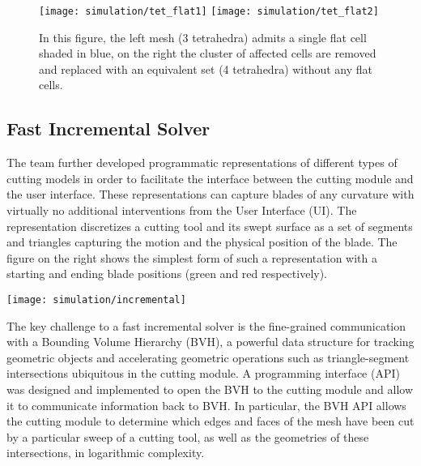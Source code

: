 \begin{figure}
  \centering%
  \texttt{[image: simulation/tet\_flat1]}\label{fig:tet_flat1}
  \hspace{10ex}
  \texttt{[image: simulation/tet\_flat2]}\label{fig:tet_flat2}
  \caption{In this figure, the left mesh (3 tetrahedra) admits a single flat cell shaded in blue, on the right the cluster of affected cells are removed and replaced with an equivalent set (4 tetrahedra) without any flat cells.}\label{fig:flat_tet}
\end{figure}


\subsection{Fast Incremental Solver}
\begin{minipage}{0.6\linewidth}
  The team further developed programmatic representations of different types of cutting models in order to facilitate the interface between the cutting module and the user interface. These representations can capture blades of any curvature with virtually no additional interventions from the User Interface (UI). The representation discretizes a cutting tool and its swept surface as a set of segments and triangles capturing the motion and the physical position of the blade. The figure on the right shows the simplest form of such a representation with a starting and ending blade positions (green and red respectively).
\end{minipage}
\hfill%
\begin{minipage}{0.4\linewidth}
  \texttt{[image: simulation/incremental]}\label{fig:incremental}
\end{minipage}

The key challenge to a fast incremental solver is the fine-grained communication with a Bounding Volume Hierarchy (BVH), a powerful data structure for tracking geometric objects and accelerating geometric operations such as triangle-segment intersections ubiquitous in the cutting module. A programming interface (API) was designed and implemented to open the BVH to the cutting module and allow it to communicate information back to BVH. In particular, the BVH API allows the cutting module to determine which edges and faces of the mesh have been cut by a particular sweep of a cutting tool, as well as the geometries of these intersections, in logarithmic complexity.

